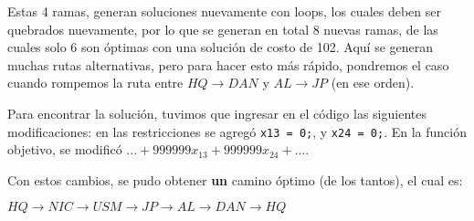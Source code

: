 \documentclass[12pt,letterpaper]{article}
\begin{document}
Estas 4 ramas, generan soluciones nuevamente con loops, los cuales deben ser quebrados nuevamente, por lo que se generan en total 8 nuevas ramas, de las cuales solo 6 son óptimas con una solución de costo de 102. Aquí se generan muchas rutas alternativas, pero para hacer esto más rápido, pondremos el caso cuando rompemos la ruta entre $HQ \to DAN$ y $AL \to JP$ (en ese orden).

Para encontrar la solución, tuvimos que ingresar en el código las siguientes modificaciones: en las restricciones se agregó \verb+x13 = 0;+, y \verb+x24 = 0;+. En la función objetivo, se modificó $... + 999999 x_{13} + 999999 x_{24} + ...$.

Con estos cambios, se pudo obtener \textbf{un} camino óptimo (de los tantos), el cual es:
\begin{center}$HQ \to NIC \to USM \to JP \to AL \to DAN \to HQ$\end{center}




\end{document}
